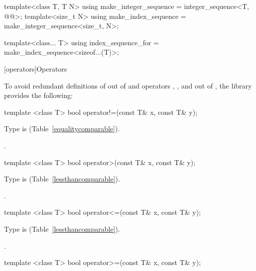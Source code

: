 \begin{codeblock}
{  template<class T, T N>
    using make_integer_sequence = integer_sequence<T, @\seebelow{}@>;
  template<size_t N>
    using make_index_sequence = make_integer_sequence<size_t, N>;

  template<class... T>
    using index_sequence_for = make_index_sequence<sizeof...(T)>;
}
\end{codeblock}

[operators]{Operators}

\pnum
To avoid redundant definitions of  out of 
and operators \tcode{>}, \tcode{<=}, and \tcode{>=} out of ,
the library provides the following:

%
\begin{itemdecl}
template <class T> bool operator!=(const T& x, const T& y);
\end{itemdecl}

\begin{itemdescr}
\pnum
\requires
Type  is  (Table~\ref{equalitycomparable}).

\pnum
\returns
{}.
\end{itemdescr}

%
\begin{itemdecl}
template <class T> bool operator>(const T& x, const T& y);
\end{itemdecl}

\begin{itemdescr}
\pnum
\requires
Type  is  (Table~\ref{lessthancomparable}).

\pnum
\returns
{}.
\end{itemdescr}

%
\begin{itemdecl}
template <class T> bool operator<=(const T& x, const T& y);
\end{itemdecl}

\begin{itemdescr}
\pnum
\requires
Type  is  (Table~\ref{lessthancomparable}).

\pnum
\returns
{}.
\end{itemdescr}

%
\begin{itemdecl}
template <class T> bool operator>=(const T& x, const T& y);
\end{itemdecl}

